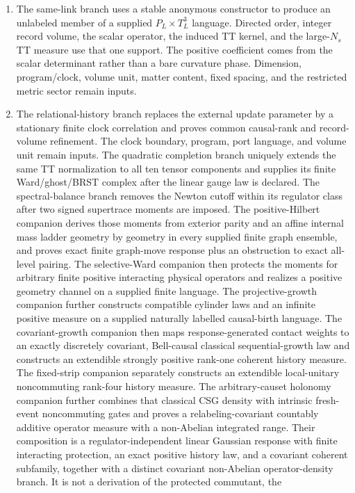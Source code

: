 \documentclass[11pt]{article}
\begin{document}
\begin{enumerate}[label=(D\arabic*)]
\item The same-link branch uses a stable anonymous constructor to produce an
unlabeled member of a supplied \(P_L\times T_L^3\) language.  Directed order,
integer record volume, the scalar operator, the induced TT kernel, and the
large-\(N_s\) TT measure use that one support.  The positive coefficient
comes from the scalar determinant rather than a bare curvature phase.
Dimension, program/clock, volume unit, matter content, fixed spacing, and
the restricted metric sector remain inputs.
\item The relational-history branch replaces the external update parameter
by a stationary finite clock correlation and proves common causal-rank and
record-volume refinement.  The clock boundary, program, port language, and
volume unit remain inputs.  The quadratic completion branch uniquely extends
the same TT normalization to all ten tensor components and supplies its
finite Ward/ghost/BRST complex after the linear gauge law is declared.  The
spectral-balance branch removes the Newton cutoff within its regulator class
after two signed supertrace moments are imposed.  The positive-Hilbert
companion derives those moments from exterior parity and an affine internal
mass ladder geometry by geometry in every supplied finite graph ensemble,
and proves exact finite graph-move response plus an obstruction to exact
all-level pairing.  The selective-Ward companion then protects the moments
for arbitrary finite positive interacting physical operators and realizes a
positive geometry channel on a supplied finite language.  The
projective-growth companion further constructs compatible cylinder laws and
an infinite positive measure on a supplied naturally labelled causal-birth
language.  The covariant-growth companion then maps response-generated
	contact weights to an exactly discretely covariant, Bell-causal classical
	sequential-growth law and constructs an extendible strongly positive
	rank-one coherent history measure.  The fixed-strip companion separately
	constructs an extendible local-unitary noncommuting rank-four history
	measure.  The arbitrary-causet holonomy companion further combines that
	classical CSG density with intrinsic fresh-event noncommuting gates and
	proves a relabeling-covariant countably additive operator measure with a
	non-Abelian integrated range.  Their composition is a
	regulator-independent linear Gaussian response with finite interacting
	protection, an exact positive history law, and a covariant coherent
	subfamily, together with a distinct covariant non-Abelian
	operator-density branch.  It is not a derivation of the protected commutant, the

\end{enumerate}
\end{document}
